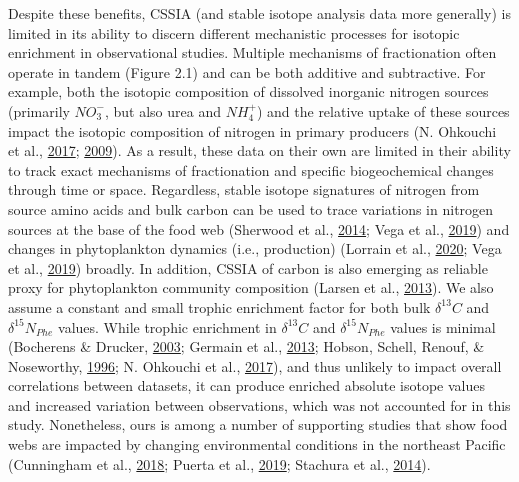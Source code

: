 \documentclass [11pt, proquest] {uwthesis}[2015/03/03]
\begin{document}
Despite these benefits, CSSIA (and stable isotope analysis data more
generally) is limited in its ability to discern different mechanistic
processes for isotopic enrichment in observational studies. Multiple
mechanisms of fractionation often operate in tandem (Figure 2.1) and can
be both additive and subtractive. For example, both the isotopic
composition of dissolved inorganic nitrogen sources (primarily
\(NO_3^-\), but also urea and \(NH_4^+\)) and the relative uptake of
these sources impact the isotopic composition of nitrogen in primary
producers (N. Ohkouchi et al.,
\protect\hyperlink{ref-Ohkouchi2017}{2017};
\protect\hyperlink{ref-Graham2010}{2009}). As a result, these data on
their own are limited in their ability to track exact mechanisms of
fractionation and specific biogeochemical changes through time or space.
Regardless, stable isotope signatures of nitrogen from source amino
acids and bulk carbon can be used to trace variations in nitrogen
sources at the base of the food web (Sherwood et al.,
\protect\hyperlink{ref-Sherwood2014}{2014}; Vega et al.,
\protect\hyperlink{ref-delaVega2019}{2019}) and changes in phytoplankton
dynamics (i.e., production) (Lorrain et al.,
\protect\hyperlink{ref-Lorrain2020}{2020}; Vega et al.,
\protect\hyperlink{ref-delaVega2019}{2019}) broadly. In addition, CSSIA
of carbon is also emerging as reliable proxy for phytoplankton community
composition (Larsen et al., \protect\hyperlink{ref-Larsen2013}{2013}).
We also assume a constant and small trophic enrichment factor for both
bulk \(\delta^{13}C\) and \(\delta^{15}N_{Phe}\) values. While trophic
enrichment in \(\delta^{13}C\) and \(\delta^{15}N_{Phe}\) values is
minimal (Bocherens \& Drucker,
\protect\hyperlink{ref-Bocherens2003}{2003}; Germain et al.,
\protect\hyperlink{ref-Germain2013}{2013}; Hobson, Schell, Renouf, \&
Noseworthy, \protect\hyperlink{ref-Hobson1996}{1996}; N. Ohkouchi et
al., \protect\hyperlink{ref-Ohkouchi2017}{2017}), and thus unlikely to
impact overall correlations between datasets, it can produce enriched
absolute isotope values and increased variation between observations,
which was not accounted for in this study. Nonetheless, ours is among a
number of supporting studies that show food webs are impacted by
changing environmental conditions in the northeast Pacific (Cunningham
et al., \protect\hyperlink{ref-Cunningham2018}{2018}; Puerta et al.,
\protect\hyperlink{ref-Puerta2019}{2019}; Stachura et al.,
\protect\hyperlink{ref-Stachura2014}{2014}).
\end{document}

